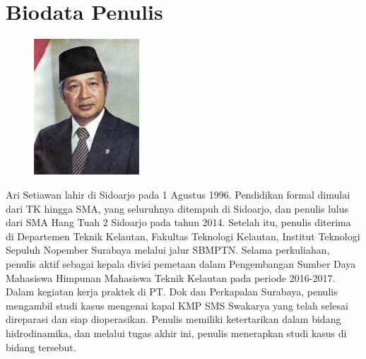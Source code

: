 \chapter{Biodata Penulis}

\begin{figure}
    \vspace{-20pt}
    \includegraphics[width=3.95cm]{gambar/soeharto.jpeg}
    \vspace{-20pt}
\end{figure}

Ari Setiawan lahir di Sidoarjo pada 1 Agustus 1996. Pendidikan formal dimulai dari TK hingga SMA, yang seluruhnya ditempuh di Sidoarjo, dan penulis lulus dari SMA Hang Tuah 2 Sidoarjo pada tahun 2014. Setelah itu, penulis diterima di Departemen Teknik Kelautan, Fakultas Teknologi Kelautan, Institut Teknologi Sepuluh Nopember Surabaya melalui jalur SBMPTN. Selama perkuliahan, penulis aktif sebagai kepala divisi pemetaan dalam Pengembangan Sumber Daya Mahasiswa Himpunan Mahasiswa Teknik Kelautan pada periode 2016-2017. Dalam kegiatan kerja praktek di PT. Dok dan Perkapalan Surabaya, penulis mengambil studi kasus mengenai kapal KMP SMS Swakarya yang telah selesai direparasi dan siap dioperasikan. Penulis memiliki ketertarikan dalam bidang hidrodinamika, dan melalui tugas akhir ini, penulis menerapkan studi kasus di bidang tersebut. 
